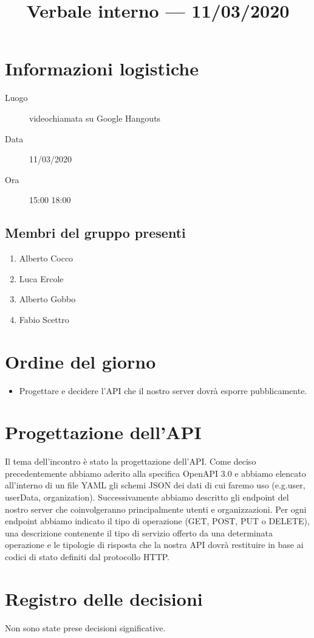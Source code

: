 \documentclass{article}
\title{Verbale interno --- 11/03/2020}
\begin{document}


\section{Informazioni logistiche}%
\label{sec:informazioni_logistiche}

\begin{description}
  \item [Luogo] videochiamata su Google Hangouts
  \item [Data] 11/03/2020
  \item [Ora] 15:00  18:00
\end{description}

\subsection{Membri del gruppo presenti}%
\label{sub:membri_del_gruppo_presenti}

\begin{enumerate}
  \item Alberto Cocco
  \item Luca Ercole
  \item Alberto Gobbo
  \item Fabio Scettro
\end{enumerate}

\section{Ordine del giorno}%
\label{sec:ordine_del_giorno}

\begin{itemize}
  \item Progettare e decidere l'API che il nostro server dovrà esporre pubblicamente.
\end{itemize}

\section{Progettazione dell'API}%
\label{sec:progettazione_API}

Il tema dell'incontro è stato la progettazione dell'API\@.
Come deciso precedentemente abbiamo aderito alla specifica OpenAPI 3.0 e abbiamo elencato all'interno di un file YAML gli schemi JSON dei dati di cui faremo uso (e.g.user, userData, organization).
Successivamente abbiamo descritto gli endpoint del nostro server che coinvolgeranno principalmente utenti e organizzazioni.
Per ogni endpoint abbiamo indicato il tipo di operazione (GET, POST, PUT o DELETE), una descrizione contenente il tipo di servizio offerto da una determinata operazione e le tipologie di risposta che la nostra API dovrà restituire in base ai codici di stato definiti dal protocollo HTTP\@.
\newpage
\section{Registro delle decisioni}%
\label{sec:registro_delle_decisioni}

Non sono state prese decisioni significative.

\end{document}
